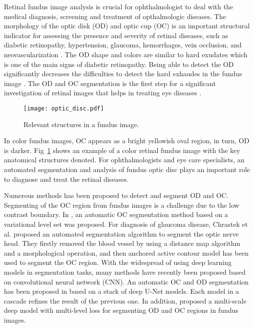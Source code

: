 \documentclass[runningheads,a4paper]{llncs}
\begin{document}
Retinal fundus image analysis is crucial for ophthalmologist to deal with the medical diagnosis, screening and treatment of opthalmologic diseases. The morphology of the optic disk (OD) and optic cup (OC) is an important structural indicator for assessing the presence and severity of retinal diseases, such as diabetic retinopathy, hypertension, glaucoma, hemorrhages, vein occlusion, and neovascularization \cite{macgillivray2014retinal}. The OD shape and colors are similar to hard exudates which is one of the main signs of diabetic retinopathy. Being able to detect the OD significantly decreases the difficulties to detect the hard exhaudes in the fundus image \cite{saleh2018learning}.
The OD and OC segmentation is the first step for a significant investigation of retinal images that helps in treating eye diseases \cite{almazroa2015optic}. 

\begin{figure}[htp]
\centering
\texttt{[image: optic\_disc.pdf]}
\caption{Relevant structures in a fundus image.}
\label{fig:figD}
\end{figure}

In color fundus images, OC appears as a bright yellowish oval region, in turn, OD is darker. Fig~\ref{fig:figD} shows an example of a color retinal fundus image with the key anatomical structures denoted. For ophthalmologists and eye care specialists, an automated segmentation and analysis of fundus optic disc plays an important role to diagnose and treat the retinal diseases. 


Numerous methods has been proposed to detect and segment OD and OC. Segmenting of the OC region from fundus images is a challenge due to the low contrast boundary.
In \cite{wong2008level}, an automatic OC segmentation method based on a variational level set was proposed. For diagnosis of glaucoma disease, Chrastek et al.\cite{chrastek2005automated} proposed an automated segmentation algorithm to segment the optic nerve head. They firstly removed the blood vessel by using a distance map algorithm and a morphological operation, and then anchored active contour model has been used to segment the OC region.
With the widespread of using deep learning models in segmentation tasks, many methods have recently been proposed based on convolutional neural network (CNN). An automatic OC and OD segmentation has been proposed in \cite{al2018multiscale} based on a stack of deep U-Net models. Each model in a cascade refines the result of the previous one. In addition, \cite{fu2018joint} proposed a multi-scale deep model with multi-level loss for segmenting OD and OC regions in fundus images. 
\end{document}
